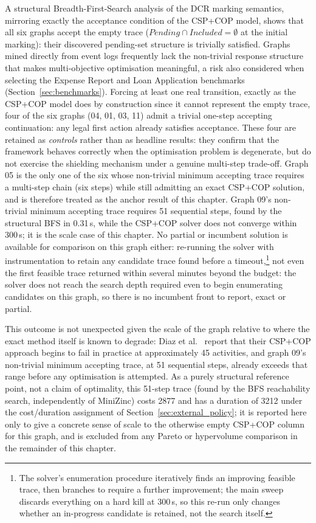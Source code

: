 A structural Breadth-First-Search analysis of the \ac{DCR} marking
semantics, mirroring exactly the acceptance condition of the CSP+COP
model, shows that all six graphs accept the empty trace
($\mathit{Pending} \cap \mathit{Included} = \emptyset$ at the initial
marking): their discovered pending-set structure is trivially
satisfied. Graphs mined directly from event logs frequently lack the
non-trivial response structure that makes multi-objective optimisation
meaningful, a risk also considered when selecting the Expense Report
and Loan Application benchmarks (Section~\ref{sec:benchmarks}). Forcing at least
one real transition, exactly as the CSP+COP model does by construction
since it cannot represent the empty trace, four of the six graphs (04,
01, 03, 11) admit a trivial one-step accepting continuation: any
legal first action already satisfies acceptance. These four are
retained as \emph{controls} rather than as headline results: they
confirm that the framework behaves correctly when the optimisation
problem is degenerate, but do not exercise the shielding mechanism
under a genuine multi-step trade-off. Graph 05 is the only one of the
six whose non-trivial minimum accepting trace requires a multi-step
chain (six steps) while still admitting an exact CSP+COP solution, and
is therefore treated as the anchor result of this chapter. Graph 09's
non-trivial minimum accepting trace requires 51 sequential steps,
found by the structural BFS in 0.31\,s, while the CSP+COP solver does
not converge within 300\,s; it is the scale case of this chapter. No
partial or incumbent solution is available for comparison on this
graph either: re-running the solver with instrumentation to retain any
candidate trace found before a timeout,\footnote{The solver's
enumeration procedure iteratively finds an improving feasible trace,
then branches to require a further improvement; the main sweep
discards everything on a hard kill at 300\,s, so this re-run only
changes whether an in-progress candidate is retained, not the search
itself.} not even the first feasible trace returned within several
minutes beyond the budget: the solver does not reach the search depth
required even to begin enumerating candidates on this graph, so there
is no incumbent front to report, exact or partial.

This outcome is not unexpected given the scale of the graph relative to
where the exact method itself is known to degrade: Diaz et
al.~\cite{Diaz2024Pareto-OptimalModels} report that their CSP+COP
approach begins to fail in practice at approximately 45 activities,
and graph 09's non-trivial minimum accepting trace, at 51 sequential
steps, already exceeds that range before any optimisation is
attempted. As a purely structural reference point, not a claim of
optimality, this 51-step trace (found by the BFS reachability search,
independently of MiniZinc) costs 2877 and has a duration of 3212 under
the cost/duration assignment of
Section~\ref{sec:external_policy}; it is reported here only
to give a concrete sense of scale to the otherwise empty CSP+COP
column for this graph, and is excluded from any Pareto or hypervolume
comparison in the remainder of this chapter.

